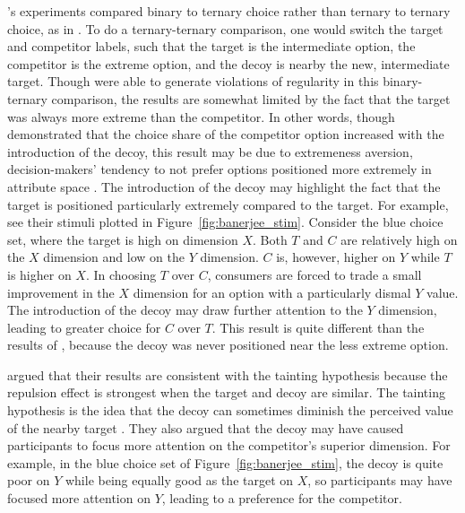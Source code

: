 \textcite{banerjeeFactorsThatPromote2024}'s experiments compared binary to ternary choice rather than ternary to ternary choice, as in \textcite{spektorWhenGoodLooks2018b}. To do a ternary-ternary comparison, one would switch the target and competitor labels, such that the target is the intermediate option, the competitor is the extreme option, and the decoy is nearby the new, intermediate target. Though \textcite{banerjeeFactorsThatPromote2024} were able to generate violations of regularity in this binary-ternary comparison, the results are somewhat limited by the fact that the target was always more extreme than the competitor. In other words, though \textcite{banerjeeFactorsThatPromote2024} demonstrated that the choice share of the competitor option increased with the introduction of the decoy, this result may be due to extremeness aversion, decision-makers' tendency to not prefer options positioned more extremely in attribute space \parencite{simonson1992choice}. The introduction of the decoy may highlight the fact that the target is positioned particularly extremely compared to the target. For example, see their stimuli plotted in Figure~\ref{fig:banerjee_stim}. Consider the blue choice set, where the target is high on dimension $X$. Both $T$ and $C$ are relatively high on the $X$ dimension and low on the $Y$ dimension. $C$ is, however, higher on $Y$ while $T$ is higher on $X$. In choosing $T$ over $C$, consumers are forced to trade a small improvement in the $X$ dimension for an option with a particularly dismal $Y$ value. The introduction of the decoy may draw further attention to the $Y$ dimension, leading to greater choice for $C$ over $T$. This result is quite different than the results of \textcite{spektorWhenGoodLooks2018b}, because the decoy was never positioned near the less extreme option. 

\textcite{banerjeeFactorsThatPromote2024} argued that their results are consistent with the tainting hypothesis because the repulsion effect is strongest when the target and decoy are similar. The tainting hypothesis is the idea that the decoy can sometimes diminish the perceived value of the nearby target \parencite{frederick2008attraction}. They also argued that the decoy may have caused participants to focus more attention on the competitor's superior dimension. For example, in the blue choice set of Figure~\ref{fig:banerjee_stim}, the decoy is quite poor on $Y$ while being equally good as the target on $X$, so participants may have focused more attention on $Y$, leading to a preference for the competitor. 

